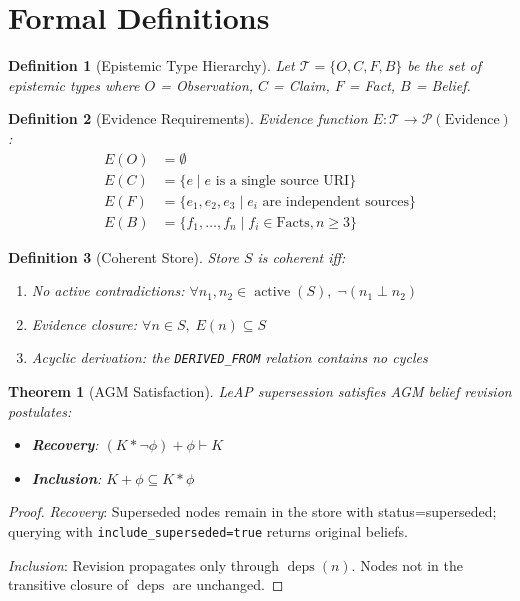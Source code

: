 \documentclass[11pt,letterpaper]{article}
\newtheorem{definition}{Definition}[section]
\newtheorem{theorem}{Theorem}[section]
\begin{document}
\appendix
\section{Formal Definitions}
\label{app:formal}

\begin{definition}[Epistemic Type Hierarchy]
\label{def:types}
Let $\mathcal{T} = \{O, C, F, B\}$ be the set of epistemic types where $O$ = Observation, $C$ = Claim, $F$ = Fact, $B$ = Belief.
\end{definition}

\begin{definition}[Evidence Requirements]
\label{def:evidence}
Evidence function $E: \mathcal{T} \to \mathcal{P}(\text{Evidence})$:
\begin{align*}
E(O) &= \emptyset \\
E(C) &= \{e \mid e \text{ is a single source URI}\} \\
E(F) &= \{e_1, e_2, e_3 \mid e_i \text{ are independent sources}\} \\
E(B) &= \{f_1, \ldots, f_n \mid f_i \in \text{Facts}, n \geq 3\}
\end{align*}
\end{definition}

\begin{definition}[Coherent Store]
\label{def:coherent}
Store $S$ is \emph{coherent} iff:
\begin{enumerate}[itemsep=0.5ex]
    \item No active contradictions: $\forall n_1, n_2 \in \operatorname{active}(S),\; \neg(n_1 \perp n_2)$
    \item Evidence closure: $\forall n \in S,\; E(n) \subseteq S$
    \item Acyclic derivation: the \texttt{DERIVED\_FROM} relation contains no cycles
\end{enumerate}
\end{definition}

\begin{theorem}[AGM Satisfaction]
\label{thm:agm}
LeAP supersession satisfies AGM belief revision postulates:
\begin{itemize}[noitemsep]
    \item \textbf{Recovery}: $(K * \neg\phi) + \phi \vdash K$
    \item \textbf{Inclusion}: $K + \phi \subseteq K * \phi$
\end{itemize}
\end{theorem}

\begin{proof}
\textit{Recovery}: Superseded nodes remain in the store with status=superseded; querying with \texttt{include\_superseded=true} returns original beliefs.

\textit{Inclusion}: Revision propagates only through $\operatorname{deps}(n)$. Nodes not in the transitive closure of $\operatorname{deps}$ are unchanged.
\end{proof}
\end{document}
